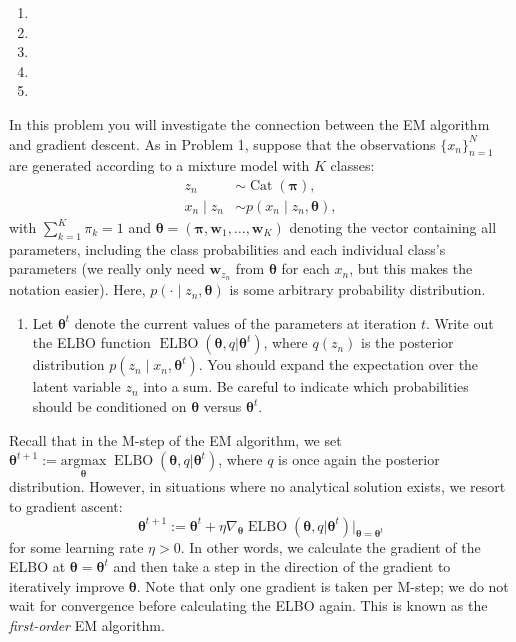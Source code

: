 \documentclass[submit]{harvardml}
\begin{document}
\begin{enumerate}
  \item 
  \item 
  \item 
  \item 
  \item 
\end{enumerate}

\begin{problem}
  
In this problem you will investigate the connection between the EM algorithm and gradient descent. As in Problem 1, suppose that the observations $\{x_n\}_{n = 1}^N$ are generated according to a mixture model with $K$ classes:
\begin{align*}
    z_n &\sim \operatorname{Cat}(\bm \pi), \\
    x_n \mid z_n &\sim p(x_n \mid z_n, \bm \theta),
\end{align*}
with $\sum_{k = 1}^K\pi_k = 1$ and $\bm \theta = (\bm \pi, \mathbf {w}_1, \dots, \mathbf{w}_K)$ denoting the vector containing all parameters, including the class probabilities and each individual class's parameters (we really only need $\mathbf{w}_{z_n}$ from $\bm \theta$ for each $x_n$, but this makes the notation easier).  Here, $p(\cdot \mid z_n, \bm \theta)$ is some arbitrary probability distribution.

\begin{enumerate}

\item Let $\bm \theta^t$ denote the current values of the parameters at iteration $t$. Write out the ELBO function $\operatorname{ELBO}(\bm \theta, q | \bm \theta^t)$, where $q(z_n)$ is the posterior distribution $p(z_n\mid x_n, \bm \theta^t)$. You should expand the expectation over the latent variable $z_n$ into a sum. Be careful to indicate which probabilities should be conditioned on $\bm \theta$ versus $\bm \theta^t$.
\end{enumerate}

Recall that in the M-step of the EM algorithm, we set $\bm \theta^{t+1} := \underset{\bm\theta}{\text{argmax}}\; \operatorname{ELBO}(\bm \theta, q | \bm \theta^t)$, where $q$ is once again the posterior distribution. However, in situations where no analytical solution exists, we resort to gradient ascent:
$$
\bm \theta^{t+1} := \bm\theta^t + \eta \nabla_{\bm\theta} \operatorname{ELBO}(\bm \theta, q | \bm \theta^t) \big|_{\bm \theta = \bm \theta^t}
$$
for some learning rate $\eta > 0$. In other words, we calculate the gradient of the ELBO at $\bm \theta = \bm \theta^t$ and then take a step in the direction of the gradient to iteratively improve $\bm \theta$. Note that only one gradient is taken per M-step; we do not wait for convergence before calculating the ELBO again. This is known as the \textit{first-order} EM algorithm.


\end{problem}
\end{document}
